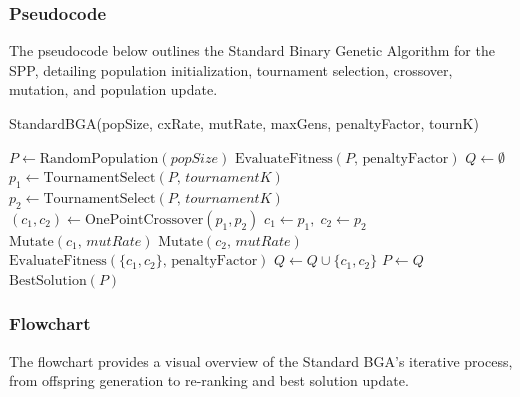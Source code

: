 \documentclass[12pt]{article}
\begin{document}
\subsubsection{Pseudocode}
The pseudocode below outlines the Standard Binary Genetic Algorithm for the SPP, detailing population initialization, tournament selection, crossover, mutation, and population update.
\begin{algorithm}[htbp]
  \caption{StandardBGA(popSize, cxRate, mutRate, maxGens, penaltyFactor, tournK)}
  \begin{algorithmic}[1]
    \State \(P \gets \text{RandomPopulation}(popSize)\) 
    \State \(\text{EvaluateFitness}(P,\,\text{penaltyFactor})\) 
      \State \(Q \gets \emptyset\) 
        \State \(p_1 \gets \text{TournamentSelect}(P,\, tournamentK)\) 
        \State \(p_2 \gets \text{TournamentSelect}(P,\, tournamentK)\) 
          \State \((c_1, c_2) \gets \text{OnePointCrossover}(p_1, p_2)\) 
        \Else
          \State \(c_1 \gets p_1,\; c_2 \gets p_2\) 
        \EndIf
        \State \(\text{Mutate}(c_1,\, mutRate)\) 
        \State \(\text{Mutate}(c_2,\, mutRate)\) 
        \State \(\text{EvaluateFitness}(\{c_1, c_2\},\, \text{penaltyFactor})\) 
        \State \(Q \gets Q \cup \{c_1, c_2\}\) 
      \EndWhile
      \State \(P \gets Q\) 
    \EndFor
    \State \Return \(\text{BestSolution}(P)\) 
  \end{algorithmic}
  \end{algorithm}

\subsubsection{Flowchart}
The flowchart provides a visual overview of the Standard BGA’s iterative process, from offspring generation to re-ranking and best solution update.
\end{document}
